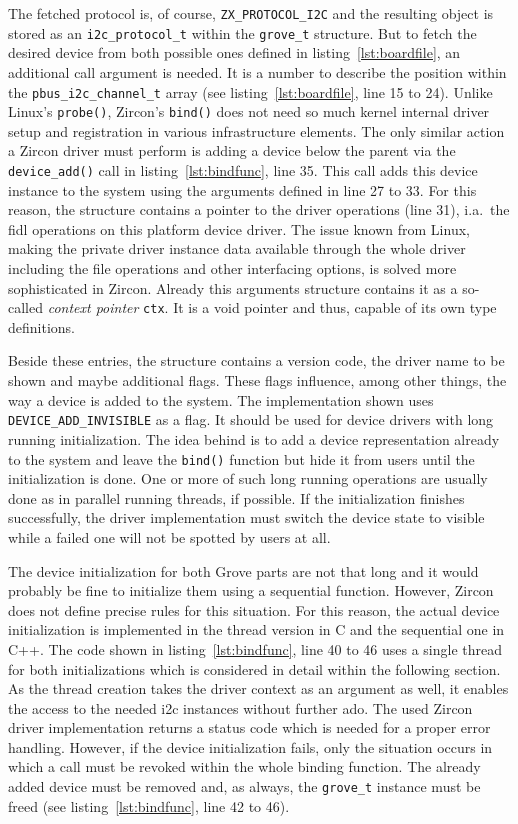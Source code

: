 %
The fetched protocol is, of course, \texttt{ZX_PROTOCOL_I2C} and the resulting object is stored as an \texttt{i2c_protocol_t} within the \texttt{grove_t} structure.
But to fetch the desired device from both possible ones defined in listing~\ref{lst:boardfile}, an additional call argument is needed.
It is a number to describe the position within the \texttt{pbus_i2c_channel_t} array (see listing~\ref{lst:boardfile}, line 15 to 24).
Unlike Linux's \texttt{probe()}, Zircon's \texttt{bind()} does not need so much kernel internal driver setup and registration in various infrastructure elements.
The only similar action a Zircon driver must perform is adding a device below the parent via the \texttt{device_add()} call in listing~\ref{lst:bindfunc}, line 35.
This call adds this device instance to the system using the arguments defined in line 27 to 33.
For this reason, the structure contains a pointer to the driver operations (line 31), i.a.\ the \ac{fidl} operations on this platform device driver.
The issue known from Linux, making the private driver instance data available through the whole driver including the file operations and other interfacing options, is solved more sophisticated in Zircon.
Already this arguments structure contains it as a so-called \textit{context pointer} \texttt{ctx}.
It is a void pointer and thus, capable of its own type definitions.

Beside these entries, the structure contains a version code, the driver name to be shown and maybe additional flags.
These flags influence, among other things, the way a device is added to the system.
The implementation shown uses \texttt{DEVICE_ADD_INVISIBLE} as a flag.
It should be used for device drivers with long running initialization.
The idea behind is to add a device representation already to the system and leave the \texttt{bind()} function but hide it from users until the initialization is done.
One or more of such long running operations are usually done as in parallel running threads, if possible.
If the initialization finishes successfully, the driver implementation must switch the device state to visible while a failed one will not be spotted by users at all.

The device initialization for both Grove parts are not that long and it would probably be fine to initialize them using a sequential function.
However, Zircon does not define precise rules for this situation.
For this reason, the actual device initialization is implemented in the thread version in C and the sequential one in C++.
The code shown in listing~\ref{lst:bindfunc}, line 40 to 46 uses a single thread for both initializations which is considered in detail within the following section.
As the thread creation takes the driver context as an argument as well, it enables the access to the needed \ac{i2c} instances without further ado.
The used Zircon driver implementation returns a status code which is needed for a proper error handling.
However, if the device initialization fails, only the situation occurs in which a call must be revoked within the whole binding function.
The already added device must be removed and, as always, the \texttt{grove_t} instance must be freed (see listing~\ref{lst:bindfunc}, line 42 to 46).

